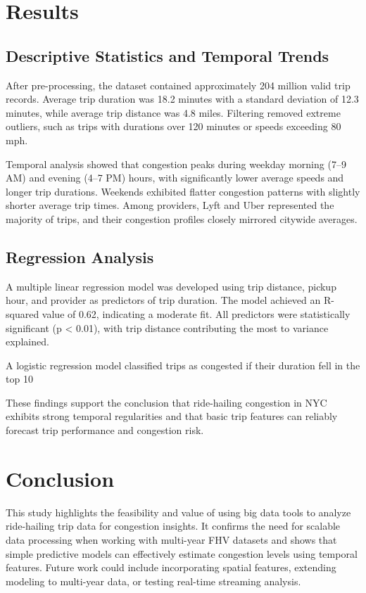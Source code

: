 \documentclass{article}
\begin{document}
\section{Results}
\subsection{Descriptive Statistics and Temporal Trends}

After pre-processing, the dataset contained approximately 204 million valid trip records. Average trip duration was 18.2 minutes with a standard deviation of 12.3 minutes, while average trip distance was 4.8 miles. Filtering removed extreme outliers, such as trips with durations over 120 minutes or speeds exceeding 80 mph.

Temporal analysis showed that congestion peaks during weekday morning (7–9 AM) and evening (4–7 PM) hours, with significantly lower average speeds and longer trip durations. Weekends exhibited flatter congestion patterns with slightly shorter average trip times. Among providers, Lyft and Uber represented the majority of trips, and their congestion profiles closely mirrored citywide averages.

\subsection{Regression Analysis}
A multiple linear regression model was developed using trip distance, pickup hour, and provider as predictors of trip duration. The model achieved an R-squared value of 0.62, indicating a moderate fit. All predictors were statistically significant (p < 0.01), with trip distance contributing the most to variance explained.

A logistic regression model classified trips as congested if their duration fell in the top 10%

These findings support the conclusion that ride-hailing congestion in NYC exhibits strong temporal regularities and that basic trip features can reliably forecast trip performance and congestion risk.

\section{Conclusion}
This study highlights the feasibility and value of using big data tools to analyze ride-hailing trip data for congestion insights. It confirms the need for scalable data processing when working with multi-year FHV datasets and shows that simple predictive models can effectively estimate congestion levels using temporal features. Future work could include incorporating spatial features, extending modeling to multi-year data, or testing real-time streaming analysis.



\end{document}
